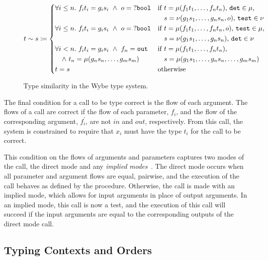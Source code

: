 \begin{figure}[ht]
  \[
    t \sim s \coloneqq \begin{cases*}
      \forall i \leq n. \ f_it_i = g_is_i\ \land\ o = \mathtt{?bool}& if $t = \mu(f_1t_1, \dots, f_nt_n)$, $\mathtt{det} \in \mu$, \\
       & \phantom{if} $s = \nu(g_1s_1, \dots, g_ns_n, o)$, $\mathtt{test} \in \nu$ \\
      \forall i \leq n.\ f_it_i = g_is_i\ \land\ o = \mathtt{?bool} & if $t = \mu(f_1t_1, \dots, f_nt_n, o)$, $\mathtt{test} \in \mu$, \\
       & \phantom{if} $s = \nu(g_1s_1, \dots, g_ns_n)$, $\mathtt{det} \in \nu$ \\
      \forall i < n.\ f_it_i = g_is_i\ \land\ f_n = \mathtt{out}& if $t = \mu(f_1t_1, \dots, f_nt_n)$, \\
      \quad \land\ t_n = \mu(g_ns_n, \dots, g_ms_m) & \phantom{if} $s = \mu(g_1s_1, \dots, g_ns_n, \dots, g_ms_m)$ \\
      t = s & otherwise
    \end{cases*}
  \]
  \caption{Type similarity in the Wybe type system.}
  \label{fig:type-sim}
\end{figure}

The final condition for a call to be type correct is the flow of each argument. The flows of a call are correct if the flow of each parameter, $f_i$, and the flow of the corresponding argument, $f^\prime_i$, are not $in$ and $out$, respectively. From this call, the system is constrained to require that $x_i$ must have the type $t_i$ for the call to be correct.

This condition on the flows of arguments and parameters captures two modes of the call, the direct mode and any \textit{implied modes}~\cite{somogyi1996execution}. The direct mode occurs when all parameter and argument flows are equal, pairwise, and the execution of the call behaves as defined by the procedure. Otherwise, the call is made with an implied mode, which allows for input arguments in place of output arguments. In an implied mode, this call is now a test, and the execution of this call will succeed if the input arguments are equal to the corresponding outputs of the direct mode call.

\subsection{Typing Contexts and Orders}
\label{sec:wybe-type-order}

